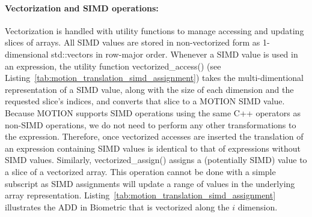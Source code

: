 \paragraph{Vectorization and SIMD operations:}
Vectorization is handled with utility functions to manage accessing and updating slices of arrays.  All SIMD values are stored in non-vectorized form as 1-dimensional {\sf std::vector}s in row-major order. %
Whenever a SIMD value is used in an expression, the utility function {\sf vectorized\_access()} (see Listing~\ref{tab:motion_translation_simd_assignment}) takes the multi-dimentional representation of a SIMD value, along with the size of each dimension and the requested slice's indices, and converts that slice to a MOTION SIMD value. Because MOTION supports SIMD operations using the same C++ operators as non-SIMD operations, we do not need to perform any other transformations to the expression.
Therefore, once vectorized accesses are inserted the translation of an expression containing SIMD values is identical to that of expressions without SIMD values.
Similarly, {\sf vectorized\_assign()} assigns a (potentially SIMD) value to a slice of a vectorized array.  This operation cannot be done with a simple subscript as SIMD assignments will update a range of values in the underlying array representation. Listing~\ref{tab:motion_translation_simd_assignment} illustrates the ADD in Biometric that is vectorized along the $i$ dimension.


